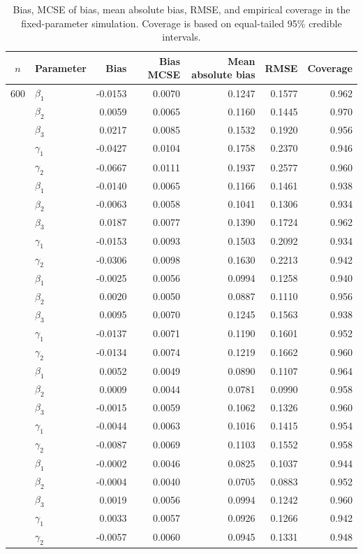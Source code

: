 \begin{table}[p]
\caption[Detailed fixed-parameter simulation results]{Bias, MCSE of bias,
mean absolute bias, RMSE, and empirical coverage in the fixed-parameter
simulation. Coverage is based on equal-tailed 95\% credible intervals.}
\label{tab:appFixedParameter}
\centering
\scriptsize
\begin{tabular}{clrrrrr}
\toprule
$n$ & Parameter & Bias & Bias MCSE & Mean absolute bias & RMSE & Coverage \\
\midrule
600
& $\beta_1$  & -0.0153 & 0.0070 & 0.1247 & 0.1577 & 0.962 \\
& $\beta_2$   &  0.0059 & 0.0065 & 0.1160 & 0.1445 & 0.970 \\
& $\beta_3$   &  0.0217 & 0.0085 & 0.1532 & 0.1920 & 0.956 \\
& $\gamma_1$  & -0.0427 & 0.0104 & 0.1758 & 0.2370 & 0.946 \\
& $\gamma_2$  & -0.0667 & 0.0111 & 0.1937 & 0.2577 & 0.960 \\
\addlinespace
800
& $\beta_1$  & -0.0140 & 0.0065 & 0.1166 & 0.1461 & 0.938 \\
& $\beta_2$   & -0.0063 & 0.0058 & 0.1041 & 0.1306 & 0.934 \\
& $\beta_3$   &  0.0187 & 0.0077 & 0.1390 & 0.1724 & 0.962 \\
& $\gamma_1$  & -0.0153 & 0.0093 & 0.1503 & 0.2092 & 0.934 \\
& $\gamma_2$  & -0.0306 & 0.0098 & 0.1630 & 0.2213 & 0.942 \\
\addlinespace
1000
& $\beta_1$  & -0.0025 & 0.0056 & 0.0994 & 0.1258 & 0.940 \\
& $\beta_2$   &  0.0020 & 0.0050 & 0.0887 & 0.1110 & 0.956 \\
& $\beta_3$   &  0.0095 & 0.0070 & 0.1245 & 0.1563 & 0.938 \\
& $\gamma_1$  & -0.0137 & 0.0071 & 0.1190 & 0.1601 & 0.952 \\
& $\gamma_2$  & -0.0134 & 0.0074 & 0.1219 & 0.1662 & 0.960 \\
\addlinespace
1200
& $\beta_1$  &  0.0052 & 0.0049 & 0.0890 & 0.1107 & 0.964 \\
& $\beta_2$   &  0.0009 & 0.0044 & 0.0781 & 0.0990 & 0.958 \\
& $\beta_3$   & -0.0015 & 0.0059 & 0.1062 & 0.1326 & 0.960 \\
& $\gamma_1$  & -0.0044 & 0.0063 & 0.1016 & 0.1415 & 0.954 \\
& $\gamma_2$  & -0.0087 & 0.0069 & 0.1103 & 0.1552 & 0.958 \\
\addlinespace
1400
& $\beta_1$  & -0.0002 & 0.0046 & 0.0825 & 0.1037 & 0.944 \\
& $\beta_2$   & -0.0004 & 0.0040 & 0.0705 & 0.0883 & 0.952 \\
& $\beta_3$   &  0.0019 & 0.0056 & 0.0994 & 0.1242 & 0.960 \\
& $\gamma_1$  &  0.0033 & 0.0057 & 0.0926 & 0.1266 & 0.942 \\
& $\gamma_2$  & -0.0057 & 0.0060 & 0.0945 & 0.1331 & 0.948 \\
\bottomrule
\end{tabular}
\end{table}

